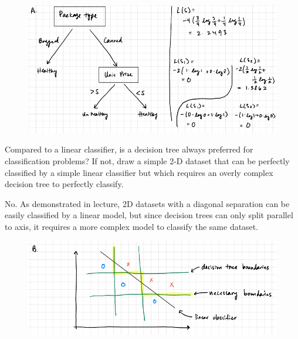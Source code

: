 \begin{solution}
    \begin{figure}[H]
        \begin{center}
        \includegraphics[width=\textwidth]{images/1a.PNG}
        \end{center}
    \end{figure}
\end{solution}

\newpage

\problem[4]
Compared to a linear classifier, is a decision tree always preferred for classification problems? If not, draw a simple 2-D dataset that can be perfectly classified by a simple linear classifier but which requires an overly complex decision tree to perfectly classify.

\begin{solution}
    No. As demonstrated in lecture, 2D datasets with a diagonal separation can be easily classified by a linear model, but since decision trees can only split parallel to axis, it requires a more complex model to classify the same dataset.

    \begin{figure}[H]
        \begin{center}
        \includegraphics[width=\textwidth]{images/1b.PNG}
        \end{center}
    \end{figure}
\end{solution}

